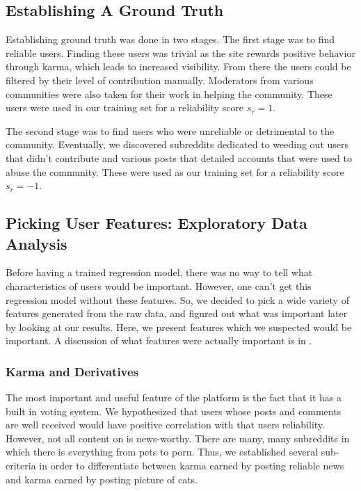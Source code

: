 \subsection{Establishing A Ground Truth} %
\label{sub:establishing_a_ground_truth}
Establishing ground truth was done in two stages. The first stage was to find
reliable users. Finding these users was trivial as the site rewards positive
behavior through karma, which leads to increased visibility. From there the
users could be filtered by their level of contribution manually. Moderators from
various communities were also taken for their work in helping the community.
These users were used in our training set for a reliability score $s_r = 1$.

The second stage was to find users who were unreliable or detrimental to the
community. Eventually, we discovered subreddits dedicated to weeding out users
that didn't contribute and various posts that detailed accounts that were used
to abuse the community. These were used as our training set for a reliability
score $s_r = -1$.


\subsection{Picking User Features: Exploratory Data Analysis} %
\label{sub:picking_user_features}

Before having a trained regression model, there was no way to tell what
characteristics of \reddit{} users would be important. However, one can't get
this regression model without these features. So, we decided to pick a wide
variety of features generated from the raw data, and figured out what was
important later by looking at our results. Here, we present features which we
suspected would be important. A discussion of what features were actually
important is in .

\subsubsection{\reddit{} Karma and Derivatives} %
\label{ssub:reddit_karma_and_derivatives}

The most important and useful feature of the \reddit{} platform is the fact that
it has a built in voting system. We hypothesized that users whose posts and
comments are well received would have positive correlation with that users
reliability. However, not all content on \reddit{} is news-worthy. There are
many, many subreddits in which there is everything from pets to porn. Thus, we
established several sub-criteria in order to differentiate between karma earned
by posting reliable news and karma earned by posting picture of cats.

